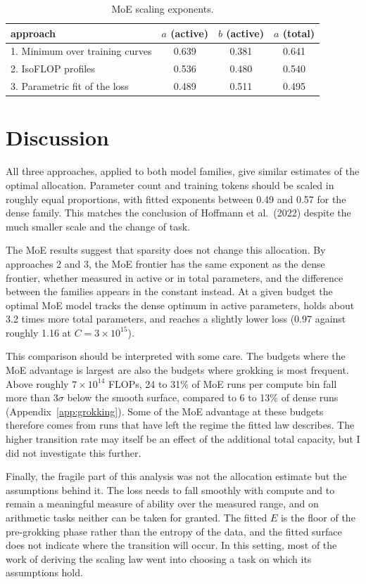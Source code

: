 \documentclass[10pt]{article}
\newcommand{\e}[1]{\times 10^{#1}}
\begin{document}
\begin{table}[h]
\centering
\small
\begin{tabular}{lccc}
\toprule
approach & $a$ (active) & $b$ (active) & $a$ (total) \\
\midrule
1. Minimum over training curves & 0.639 & 0.381 & 0.641 \\
2. IsoFLOP profiles             & 0.536 & 0.480 & 0.540 \\
3. Parametric fit of the loss   & 0.489 & 0.511 & 0.495 \\
\bottomrule
\end{tabular}
\caption{MoE scaling exponents.}
\label{tab:moe}
\end{table}

\section{Discussion}

All three approaches, applied to both model families, give similar estimates
of the optimal allocation. Parameter count and training tokens should be
scaled in roughly equal proportions, with fitted exponents between 0.49 and
0.57 for the dense family. This matches the conclusion of Hoffmann et al.\
(2022) despite the much smaller scale and the change of task.

The MoE results suggest that sparsity does not change this allocation. By
approaches 2 and 3, the MoE frontier has the same exponent as the dense
frontier, whether measured in active or in total parameters, and the
difference between the families appears in the constant instead. At a given
budget the optimal MoE model tracks the dense optimum in active parameters,
holds about 3.2 times more total parameters, and reaches a slightly lower
loss (0.97 against roughly 1.16 at $C = 3\e{15}$).

This comparison should be interpreted with some care. The budgets where the
MoE advantage is largest are also the budgets where grokking is most
frequent. Above roughly $7\e{14}$ FLOPs, 24 to 31\% of MoE runs per compute
bin fall more than $3\sigma$ below the smooth surface, compared to 6 to
13\% of dense runs (Appendix~\ref{app:grokking}). Some of the MoE advantage
at these budgets therefore comes from runs that have left the regime the
fitted law describes. The higher transition rate may itself be an effect of
the additional total capacity, but I did not investigate this further.

Finally, the fragile part of this analysis was not the allocation estimate
but the assumptions behind it. The loss needs to fall smoothly with compute
and to remain a meaningful measure of ability over the measured range, and
on arithmetic tasks neither can be taken for granted. The fitted $E$ is the
floor of the pre-grokking phase rather than the entropy of the data, and
the fitted surface does not indicate where the transition will occur. In
this setting, most of the work of deriving the scaling law went into
choosing a task on which its assumptions hold.
\end{document}
